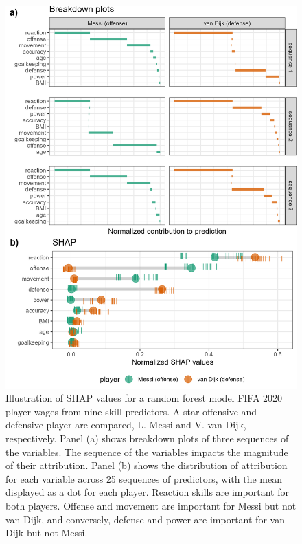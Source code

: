 \documentclass[
]{jss}
\begin{document}
\begin{CodeChunk}
\begin{figure}

{\centering \includegraphics[width=0.85\linewidth]{./figures/shap_distr_bd} 

}

\caption[Illustration of SHAP values for a random forest model FIFA 2020 player wages from nine skill predictors]{Illustration of SHAP values for a random forest model FIFA 2020 player wages from nine skill predictors. A star offensive and defensive player are compared, L. Messi and V. van Dijk, respectively. Panel (a) shows breakdown plots of three sequences of the variables. The sequence of the variables impacts the magnitude of their attribution. Panel (b) shows the distribution of attribution for each variable across 25 sequences of predictors, with the mean displayed as a dot for each player. Reaction skills are important for both players. Offense and movement are important for Messi but not van Dijk, and conversely, defense and power are important for van Dijk but not Messi.}\label{fig:shapdistrbd}
\end{figure}
\end{CodeChunk}
\end{document}
